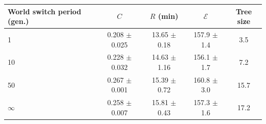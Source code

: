 \begin{tabular}{lcccc}\toprule
World switch period (gen.) & $C$ & $R$ (min) & $\mathcal{E}$ & Tree size\\\midrule
1 & 0.208 $\pm$ 0.025 & 13.65 $\pm$ 0.18 & 157.9 $\pm$ 1.4 & 3.5\\
10 & 0.228 $\pm$ 0.032 & 14.63 $\pm$ 1.16 & 156.1 $\pm$ 1.7 & 7.2\\
50 & 0.267 $\pm$ 0.001 & 15.39 $\pm$ 0.72 & 160.8 $\pm$ 3.0 & 15.7\\
$\infty$ & 0.258 $\pm$ 0.007 & 15.81 $\pm$ 0.43 & 157.3 $\pm$ 1.6 & 17.2\\
\bottomrule
\end{tabular}